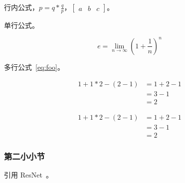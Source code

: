 行内公式，$p = q * \frac{q}{p}$，$\begin{bmatrix} a & b & c \end{bmatrix}$。

单行公式。

\begin{equation}
    e = \lim_{n\to \infty} \left(1 + \frac{1}{n}\right)^n
\end{equation}

多行公式~\ref{eq:foo}。

\begin{equation}
    \begin{aligned}
        1+ 1*2 - (2-1) & = 1+ 2 - 1 \\
                       & = 3-1      \\
                       & = 2
    \end{aligned}
    \label{eq:foo}
\end{equation}



\begin{equation*}
    \begin{aligned}
        1+ 1*2 - (2-1) & = 1+ 2 - 1 \\
                       & = 3-1      \\
                       & = 2
    \end{aligned}
\end{equation*}

\subsubsection{第二小小节}

引用 ResNet~\cite{he2016deep}。

